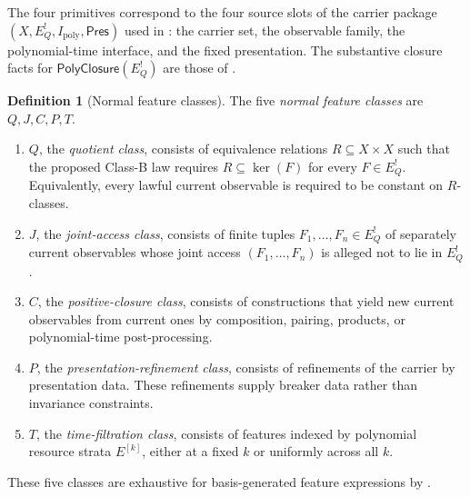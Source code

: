 \documentclass[11pt]{article}
\newcommand{\Ipoly}{I_{\mathrm{poly}}}
\newcommand{\EQbang}{E^{!}_{Q}}
\theoremstyle{definition}
\newtheorem{definition}[theorem]{Definition}
\begin{document}
The four primitives correspond to the four source slots of the carrier
package \((X,\EQbang,\Ipoly,\mathsf{Pres})\) used in
: the carrier set, the observable
family, the polynomial-time interface, and the fixed presentation.
The substantive closure facts for \(\mathsf{PolyClosure}(\EQbang)\)
are those of .

\begin{definition}[Normal feature classes]
\label{def:pvnp:normal-classes}
The five \emph{normal feature classes} are \(Q,J,C,P,T\).
\begin{enumerate}
  \item \(Q\), the \emph{quotient class}, consists of equivalence
  relations \(R\subseteq X\times X\) such that the proposed Class-B
  law requires \(R\subseteq\ker(F)\) for every \(F\in\EQbang\).
  Equivalently, every lawful current observable is required to be
  constant on \(R\)-classes.

  \item \(J\), the \emph{joint-access class}, consists of finite
  tuples \(F_1,\ldots,F_n\in\EQbang\) of separately current
  observables whose joint access \((F_1,\ldots,F_n)\) is alleged not
  to lie in \(\EQbang\).

  \item \(C\), the \emph{positive-closure class}, consists of
  constructions that yield new current observables from current ones
  by composition, pairing, products, or polynomial-time
  post-processing.

  \item \(P\), the \emph{presentation-refinement class}, consists of
  refinements of the carrier by presentation data.  These refinements
  supply breaker data rather than invariance constraints.

  \item \(T\), the \emph{time-filtration class}, consists of features
  indexed by polynomial resource strata \(E^{[k]}\), either at a fixed
  \(k\) or uniformly across all \(k\).
\end{enumerate}
\end{definition}

These five classes are exhaustive for basis-generated feature
expressions by .
\end{document}
